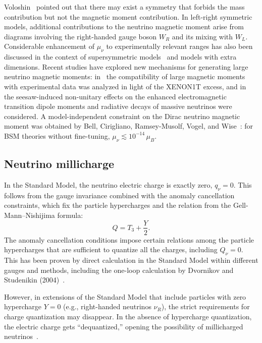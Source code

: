 \documentclass[a4paper,11pt]{article}
\begin{document}
Voloshin~\cite{Voloshin:1988} pointed out that there may exist a symmetry that forbids the mass contribution but not the magnetic moment contribution. In left-right symmetric models, additional contributions to the neutrino magnetic moment arise from diagrams involving the right-handed gauge boson $W_R$ and its mixing with $W_L$. Considerable enhancement of $\mu_\nu$ to experimentally relevant ranges has also been discussed in the context of supersymmetric models~\cite{Barr:Freire:Zee:1990} and models with extra dimensions. Recent studies have explored new mechanisms for generating large neutrino magnetic moments: in~\cite{Babu:Jana:Lindner:2020} the compatibility of large magnetic moments with experimental data was analyzed in light of the XENON1T excess, and in~\cite{Xing:Zhou:2012} the seesaw-induced non-unitary effects on the enhanced electromagnetic transition dipole moments and radiative decays of massive neutrinos were considered. A model-independent constraint on the Dirac neutrino magnetic moment was obtained by Bell, Cirigliano, Ramsey-Musolf, Vogel, and Wise~\cite{Bell:2005}: for BSM theories without fine-tuning, $\mu_\nu \lesssim 10^{-14}\,\mu_B$.

\subsection{Neutrino millicharge}

In the Standard Model, the neutrino electric charge is exactly zero, $q_\nu = 0$. This follows from the gauge invariance combined with the anomaly cancellation constraints, which fix the particle hypercharges and the relation from the Gell-Mann--Nishijima formula:
\begin{equation}
Q = T_3 + \frac{Y}{2}.
\end{equation}
The anomaly cancellation conditions impose certain relations among the particle hypercharges that are sufficient to quantize all the charges, including $Q_\nu = 0$. This has been proven by direct calculation in the Standard Model within different gauges and methods, including the one-loop calculation by Dvornikov and Studenikin (2004)~\cite{Dvornikov:Studenikin:2004PRD}.

However, in extensions of the Standard Model that include particles with zero hypercharge $Y = 0$ (e.g., right-handed neutrinos $\nu_R$), the strict requirements for charge quantization may disappear. In the absence of hypercharge quantization, the electric charge gets ``dequantized,'' opening the possibility of millicharged neutrinos~\cite{Studenikin:2014EPL}.
\end{document}
